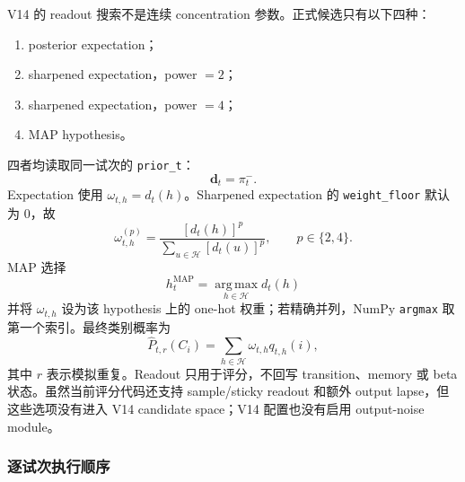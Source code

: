 V14 的 readout 搜索不是连续 concentration 参数。正式候选只有以下四种：
\begin{enumerate}
    \item posterior expectation；
    \item sharpened expectation，power $=2$；
    \item sharpened expectation，power $=4$；
    \item MAP hypothesis。
\end{enumerate}
四者均读取同一试次的 \texttt{prior\_t}：
\begin{equation}
    \mathbf d_t=\pi_t^-.
    \label{eq:modelv14-readout-input}
\end{equation}
Expectation 使用 $\omega_{t,h}=d_t(h)$。Sharpened expectation 的 \texttt{weight\_floor} 默认为 0，故
\begin{equation}
    \omega_{t,h}^{(p)}
    =
    \frac{[d_t(h)]^p}
    {\sum_{u\in\mathcal H}[d_t(u)]^p},
    \qquad p\in\{2,4\}.
    \label{eq:modelv14-sharpened-readout}
\end{equation}
MAP 选择
\begin{equation}
    h_t^{\mathrm{MAP}}
    =
    \operatorname*{arg\,max}_{h\in\mathcal H}d_t(h)
    \label{eq:modelv14-map}
\end{equation}
并将 $\omega_{t,h}$ 设为该 hypothesis 上的 one-hot 权重；若精确并列，NumPy \texttt{argmax} 取第一个索引。最终类别概率为
\begin{equation}
    \widehat P_{t,r}(C_i)
    =
    \sum_{h\in\mathcal H}
    \omega_{t,h}
    q_{t,h}(i),
    \label{eq:modelv14-choice-probability}
\end{equation}
其中 $r$ 表示模拟重复。Readout 只用于评分，不回写 transition、memory 或 beta 状态。虽然当前评分代码还支持 sample/sticky readout 和额外 output lapse，但这些选项没有进入 V14 candidate space；V14 配置也没有启用 output-noise module。


\subsubsection{逐试次执行顺序}


